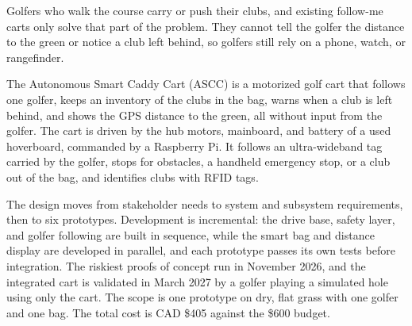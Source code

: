 \clearpage{}

Golfers who walk the course carry or push their clubs, and existing follow-me carts only solve that part of the problem. They cannot tell the golfer the distance to the green or notice a club left behind, so golfers still rely on a phone, watch, or rangefinder.

The Autonomous Smart Caddy Cart (ASCC) is a motorized golf cart that follows one golfer, keeps an inventory of the clubs in the bag, warns when a club is left behind, and shows the GPS distance to the green, all without input from the golfer. The cart is driven by the hub motors, mainboard, and battery of a used hoverboard, commanded by a Raspberry Pi. It follows an ultra-wideband tag carried by the golfer, stops for obstacles, a handheld emergency stop, or a club out of the bag, and identifies clubs with RFID tags.

The design moves from stakeholder needs to system and subsystem requirements, then to six prototypes. Development is incremental: the drive base, safety layer, and golfer following are built in sequence, while the smart bag and distance display are developed in parallel, and each prototype passes its own tests before integration. The riskiest proofs of concept run in November 2026, and the integrated cart is validated in March 2027 by a golfer playing a simulated hole using only the cart. The scope is one prototype on dry, flat grass with one golfer and one bag. The total cost is CAD \$405 against the \$600 budget.
\clearpage
